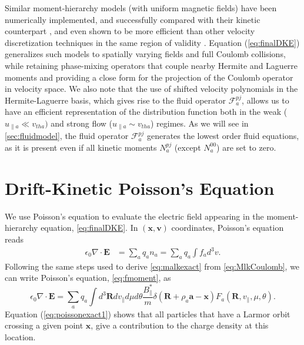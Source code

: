 {{{Similar moment-hierarchy models (with uniform magnetic fields) have been numerically implemented, and successfully compared with their kinetic counterpart \citep{Paskauskas2009,Loureiro2015,Schekochihin2016,Groselj2017}, and even shown to be more efficient than other velocity discretization techniques in the same region of validity \citep{Camporeale2016}. Equation (\ref{eq:finalDKE}) generalizes such models to spatially varying fields and full Coulomb collisions, while retaining phase-mixing operators that couple nearby Hermite and Laguerre moments and providing a close form for the projection of the Coulomb operator in velocity space. We also note that the use of shifted velocity polynomials in the Hermite-Laguerre basis, which gives rise to the fluid operator $\mathcal{F}_a^{pj}$, allows us to have an efficient representation of the distribution function both in the weak ($u_{\parallel a} \ll v_{th a})$ and strong flow ($u_{\parallel a} \sim v_{th a}$) regimes. As we will see in \cref{sec:fluidmodel}, the fluid operator $\mathcal{F}_a^{pj}$ generates the lowest order fluid equations, as it is present even if all kinetic moments $N_a^{pj}$ (except $N_a^{00}$) are set to zero.}

\section{Drift-Kinetic Poisson's Equation}
\label{sec:poisson}

We use Poisson's equation to evaluate the electric field appearing in the moment-hierarchy equation, \cref{eq:finalDKE}.
In $(\mathbf x, \mathbf v)$ coordinates, Poisson's equation reads
%
\begin{equation}
\begin{split}
        \epsilon_0 \nabla \cdot \mathbf E &= \sum_a q_a n_a=\sum_a q_a \int f_a d^3 v.
\end{split}
\label{eq:fmoment}
\end{equation}
%
Following the same steps used to derive \cref{eq:malkexact} from \cref{eq:MlkCoulomb}, we can write Poisson's equation, \cref{eq:fmoment}, as
%
\begin{equation}
    \epsilon_0 \nabla \cdot \mathbf E = \sum_a q_a \int d^3 \mathbf R dv_\parallel d\mu d\theta \frac{B_\parallel^*}{m} \delta(\mathbf R + \rho_a \mathbf a - \mathbf x)F_a(\mathbf R, v_\parallel, \mu, \theta).
    \label{eq:poissonexact1}
\end{equation}
%
Equation (\ref{eq:poissonexact1}) shows that all particles that have a Larmor orbit crossing a given point $\mathbf x$, give a contribution to the charge density at this location.

}}

